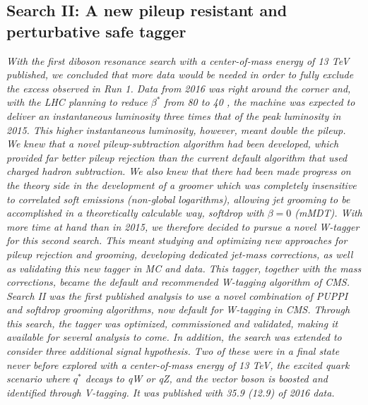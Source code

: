 \vspace*{\fill}
\begin{centering}
\chapter{Search II: A new pileup resistant and perturbative safe tagger}
\label{searchII}
\textit{
\noindent With the first diboson resonance search with a center-of-mass energy of 13 TeV published, we concluded that more data would be needed in order to fully exclude the excess observed in Run 1. Data from 2016 was right around the corner and, with the LHC planning to reduce $\beta^*$ from 80 to 40 \cm, the machine was expected to deliver an instantaneous luminosity three times that of the peak luminosity in 2015. This higher instantaneous luminosity, however, meant double the pileup.
\newline
\newline
We knew that a novel pileup-subtraction algorithm had been developed, which provided far better pileup rejection than the current default algorithm that used charged hadron subtraction. We also knew that there had been made progress on the theory side in the development of a groomer which was completely insensitive to correlated soft emissions (non-global logarithms), allowing jet grooming to be accomplished in a theoretically calculable way, softdrop with $\beta = 0$ (mMDT).
\newline
\newline
With more time at hand than in 2015, we therefore decided to pursue a novel W-tagger for this second search. This meant studying and optimizing new approaches for pileup rejection and grooming, developing dedicated jet-mass corrections, as well as validating this new tagger in MC and data. This tagger, together with the mass corrections, became the default and recommended W-tagging algorithm of CMS.
\newline
\newline
Search II was the first published analysis to use a novel combination of PUPPI and softdrop grooming algorithms, now default for W-tagging in CMS. Through this search, the tagger was optimized, commissioned and validated, making it available for several analysis to come. In addition, the search was extended to consider three additional signal hypothesis. Two of these were in a final state never before explored with a center-of-mass energy of 13 TeV, the excited quark scenario where $q^*$ decays to qW or qZ, and the vector boson is boosted and identified through V-tagging. It was published with 35.9 (12.9) \fbinv of 2016 data.
}
\end{centering}
